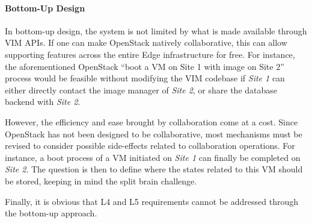 

\paragraph{Bottom-Up Design}
In bottom-up design, the system is not limited by what is made
available through VIM APIs. If one can make OpenStack natively
collaborative, this can allow supporting features across the entire
Edge infrastructure for free. For instance, the aforementioned
OpenStack ``boot a VM on Site 1 with image on Site 2'' process would
be feasible without modifying the VIM codebase if \emph{Site 1} can
either directly contact the image manager of \emph{Site 2}, or share
the database backend with \emph{Site 2}.

However, the efficiency and ease brought by collaboration come at a
cost. Since OpenStack has not been designed to be collaborative, most
mechanisms must be revised to consider possible side-effects related to
collaboration operations.
%
For instance, a boot process of a VM initiated on \emph{Site 1} can finally be
completed on \emph{Site 2}. The question is then to define where the states
related to this VM should be stored, keeping in mind the split brain
challenge.

Finally, it is obvious that L4 and L5 requirements cannot be addressed through
the bottom-up approach. 

%



